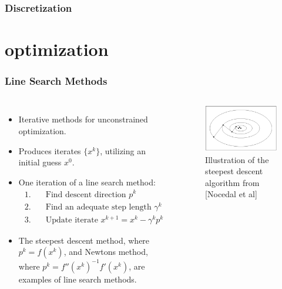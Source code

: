 \documentclass[9pt]{beamer}
\begin{document}
\begin{frame}
\frametitle{Discretization}
\end{frame}
\section{optimization}
\begin{frame}
\frametitle{Line Search Methods}
\begin{columns}
\begin{itemize}
\item{Iterative methods for unconstrained optimization.}
\item{Produces iterates $\{x^k\}$, utilizing an initial guess $x^0$.}
\item{One iteration of a line search method:}
{\small
\begin{align*}
1.\quad& \textrm{Find descent direction $p^k$}\\
2.\quad& \textrm{Find an adequate step length $\gamma^k$}\\
3.\quad& \textrm{Update iterate $x^{k+1} = x^k -\gamma^k p^k$}
\end{align*}
}%
\item{The steepest descent method, where $p^k=f(x^k)$, and Newtons method, where $p^k =f''(x^k)^{-1}f'(x^k)$, are examples of line search methods. }
\end{itemize}
\begin{figure}[!h]
\centering
\includegraphics[scale=0.3,angle=90]{SD.png}
\caption{Illustration of the steepest descent algorithm from [Nocedal et al]}
\end{figure}
\end{columns}
\end{frame}
\end{document}
